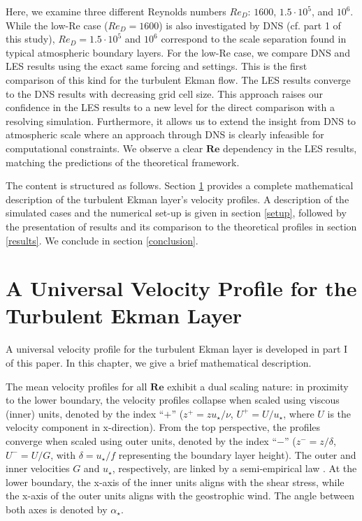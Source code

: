 \documentclass[a4paper,11pt]{article}
\newcommand{\RE}{\mathbf{Re}}
\begin{document}
Here, we examine three different Reynolds numbers $Re_D$: $1600$, $1.5\cdot10^5$, and $10^6$. While the low-Re case ($Re_D=1600$) is also investigated by DNS (cf. part 1 of this study), $Re_D=1.5 \cdot 10^5$ and $10^6$ correspond to the scale separation found in typical atmospheric boundary layers. For the low-Re case, we compare DNS and LES results using the exact same forcing and settings. This is the first comparison of this kind for the turbulent Ekman flow. The LES results converge to the DNS results with decreasing grid cell size. This approach raises our confidence in the LES results to a new level for the direct comparison with a resolving simulation. Furthermore, it allows us to extend the insight from DNS to atmospheric scale where an approach through DNS is clearly infeasible for computational constraints. We observe a clear $\RE$ dependency in the LES results, matching the predictions of the theoretical framework.

The content is structured as follows. Section \ref{universal_profile} provides a complete mathematical description of the turbulent Ekman layer's velocity profiles. A description of the simulated cases and the numerical set-up is given in section \ref{setup}, followed by the presentation of results and its comparison to the theoretical profiles in section \ref{results}. We conclude in section \ref{conclusion}.

\section{A Universal Velocity Profile for the Turbulent Ekman Layer}
\label{universal_profile}

A universal velocity profile for the turbulent Ekman layer is developed in part I of this paper. In this chapter, we give a brief mathematical description.

The mean velocity profiles for all $\RE$ exhibit a dual scaling nature: in proximity to the lower boundary, the velocity profiles collapse when scaled using viscous (inner) units, denoted by the index ``$+$'' ($z^+ = zu_\star/\nu$, $U^+=U/u_\star$, where $U$ is the velocity component in x-direction). From the top perspective, the profiles converge when scaled using outer units, denoted by the index ``$-$'' ($z^-=z/\delta$, $U^-=U/G$, with $\delta=u_\star/f$ representing the boundary layer height). The outer and inner velocities $G$ and $u_\star$, respectively, are linked by a semi-empirical law \cite{spalart1989theoretical}. At the lower boundary, the x-axis of the inner units aligns with the shear stress, while the x-axis of the outer units aligns with the geostrophic wind. The angle between both axes is denoted by $\alpha_\star$.
\end{document}
